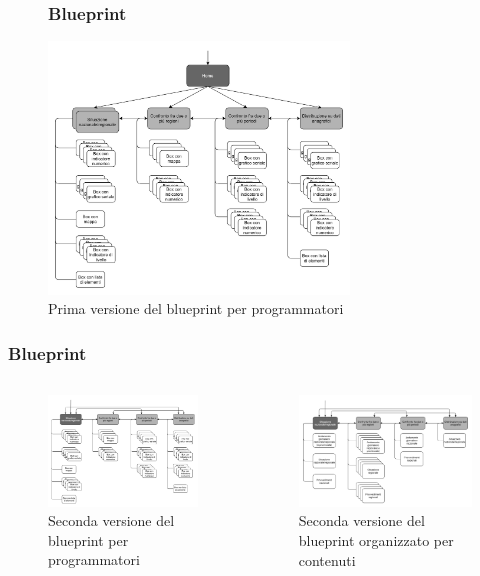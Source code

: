 \documentclass[handout]{beamer}
\begin{document}
		\begin{frame}
			\begin{figure}
				\frametitle{Blueprint}
				\includegraphics[width=8cm]{img/blueprint-prog-1}
				\caption{Prima versione del blueprint per programmatori}
			\end{figure}
		\end{frame}

		\begin{frame}
			\frametitle{Blueprint}
			\begin{columns}[t]
					\begin{column}[T]{5cm}
						\begin{figure}
							\includegraphics[width=5cm]{img/blueprint-prog-2}
							\caption{Seconda versione del blueprint per programmatori}
						\end{figure}
					\end{column}
					\begin{column}[T]{5cm}
						\begin{figure}
							\includegraphics[width=5cm]{img/blueprint-cont-2}
							\caption{Seconda versione del blueprint organizzato per contenuti}
						\end{figure}
					\end{column}
			\end{columns}
		\end{frame}
\end{document}
